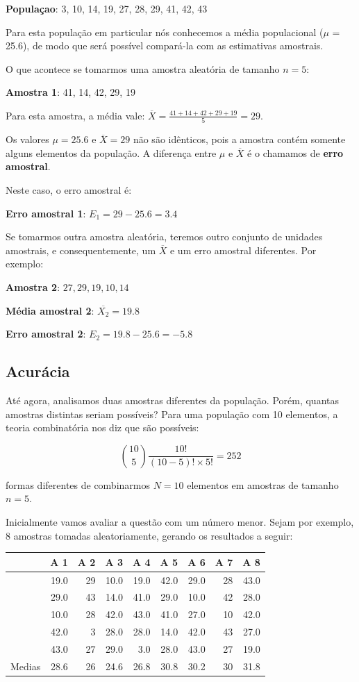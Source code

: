\documentclass[
]{book}
\begin{document}
\textbf{Populaçao}: 3, 10, 14, 19, 27, 28, 29, 41, 42, 43

Para esta população em particular nós conhecemos a média populacional (\(\mu\) = 25.6), de modo que será possível compará-la com as estimativas amostrais.

O que acontece se tomarmos uma amostra aleatória de tamanho \(n = 5\):

\textbf{Amostra 1}: 41, 14, 42, 29, 19

Para esta amostra, a média vale: \(\overline{X} =\frac{41+14+42+29+19}{5} = 29\).

Os valores \(\mu = 25.6\) e \(\overline{X} = 29\) não são idênticos, pois a amostra contém somente alguns elementos da população. A diferença entre \(\mu\) e \(\overline{X}\) é o chamamos de \textbf{erro amostral}.

Neste caso, o erro amostral é:

\textbf{Erro amostral 1}: \(E_1 = 29 - 25.6 = 3.4\)

Se tomarmos outra amostra aleatória, teremos outro conjunto de unidades amostrais, e consequentemente, um \(\overline{X}\) e um erro amostral diferentes. Por exemplo:

\textbf{Amostra 2}: \(27, 29, 19, 10, 14\)

\textbf{Média amostral 2}: \(\overline{X_2} = 19.8\)

\textbf{Erro amostral 2}: \(E_2 = 19.8 - 25.6 = -5.8\)

\hypertarget{acuruxe1cia}{%
\subsection{Acurácia}\label{acuruxe1cia}}

Até agora, analisamos duas amostras diferentes da população. Porém, quantas amostras distintas seriam possíveis? Para uma população com 10 elementos, a teoria combinatória nos diz que são possíveis:

\[{{10}\choose{5}} \frac{10!}{(10-5)! \times 5!} = 252\]

formas diferentes de combinarmos \(N = 10\) elementos em amostras de tamanho \(n = 5\).

Inicialmente vamos avaliar a questão com um número menor. Sejam por exemplo, 8 amostras tomadas aleatoriamente, gerando os resultados a seguir:

\begin{tabular}{l|r|r|r|r|r|r|r|r}
\hline
  & A 1 & A 2 & A 3 & A 4 & A 5 & A 6 & A 7 & A 8\\
\hline
 & 19.0 & 29 & 10.0 & 19.0 & 42.0 & 29.0 & 28 & 43.0\\
\hline
 & 29.0 & 43 & 14.0 & 41.0 & 29.0 & 10.0 & 42 & 28.0\\
\hline
 & 10.0 & 28 & 42.0 & 43.0 & 41.0 & 27.0 & 10 & 42.0\\
\hline
 & 42.0 & 3 & 28.0 & 28.0 & 14.0 & 42.0 & 43 & 27.0\\
\hline
 & 43.0 & 27 & 29.0 & 3.0 & 28.0 & 43.0 & 27 & 19.0\\
\hline
Medias & 28.6 & 26 & 24.6 & 26.8 & 30.8 & 30.2 & 30 & 31.8\\
\hline
\end{tabular}
\end{document}
